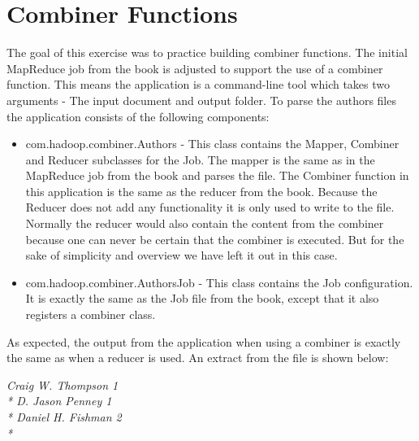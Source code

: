 \documentclass[Combiner.tex]{subfiles}
\begin{document}
\section{Combiner Functions}
The goal of this exercise was to practice building combiner functions. The initial MapReduce job from the book is adjusted to support the use of a combiner function. This means the application is a command-line tool which takes two arguments - The input document and output folder. To parse the authors files the application consists of the following components:

\begin{itemize}
\item com.hadoop.combiner.Authors - This class contains the Mapper, Combiner and Reducer subclasses for the Job. The mapper is the same as in the MapReduce job from the book and parses the file. The Combiner function in this application is the same as the reducer from the book. Because the Reducer does not add any functionality it is only used to write to the file. Normally the reducer would also contain the content from the combiner because one can never be certain that the combiner is executed. But for the sake of simplicity and overview we have left it out in this case.
\item com.hadoop.combiner.AuthorsJob - This class contains the Job configuration. It is exactly the same as the Job file from the book, except that it also registers a combiner class.
\end{itemize}

As expected, the output from the application when using a combiner is exactly the same as when a reducer is used. An extract from the file is shown below:

\textit{Craig W. Thompson 1 \\*
D. Jason Penney 1 \\*
Daniel H. Fishman 2 \\*}
\end{document}
